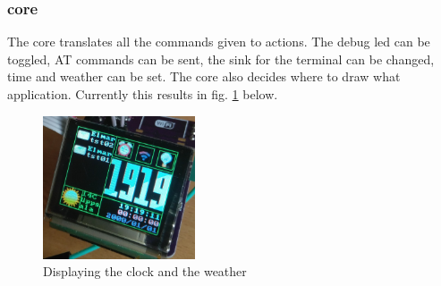 \subsubsection{core}
The core translates all the commands given to actions. The debug led can be toggled, AT commands can be sent, the sink for the terminal can be changed, time and weather can be set. The core also decides where to draw what application. Currently this results in fig. \ref{fig:clock_weather} below.
\begin{figure}[H]
	\centering
	\label{fig:clock_weather}
	\includegraphics[width=0.4\textwidth]{./fig/clock_weather.png}
	\caption{Displaying the clock and the weather}
\end{figure}